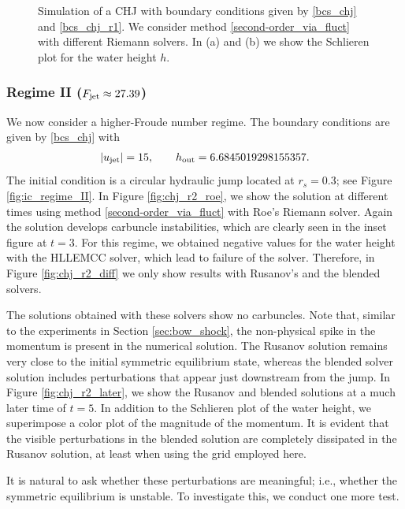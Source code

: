 \documentclass[preprint, 11pt]{article}
\newcommand{\out}{\textup{out}}
\newcommand{\jet}{{\textup{jet}}}
\newcommand{\bfu}{{u}}
\begin{document}
\begin{figure}[!h]
{\begin{tabular}{c}
    \end{tabular}
  }
    \caption{Simulation of a CHJ with boundary conditions given by \eqref{bcs_chj} and \eqref{bcs_chj_r1}.    
      We consider method \eqref{second-order_via_fluct} with different Riemann solvers.
      In (a) and (b) we show the Schlieren plot for the water height $h$.
    \label{fig:chj_r1}}
\end{figure}

\subsubsection{Regime II ($F_\jet\approx27.39$)}\label{sec:regime_ii}
We now consider a higher-Froude number regime. The boundary conditions are
given by \eqref{bcs_chj} with 
\begin{align}\label{bcs_chj_r2}
  |\bfu_\jet|=15, \qquad h_\out=6.6845019298155357.
\end{align}
The initial condition is a circular hydraulic jump located at $r_s=0.3$; see Figure \ref{fig:ic_regime_II}.
In Figure \ref{fig:chj_r2_roe}, we show the solution at different times using method
\eqref{second-order_via_fluct} with Roe's Riemann solver. Again the solution develops
carbuncle instabilities, which are clearly seen in the inset figure at $t=3$.
For this regime, we obtained negative values for the water height with
the HLLEMCC solver, which lead to failure of the solver. Therefore, in Figure
\ref{fig:chj_r2_diff} we only show results with Rusanov's and the blended
solvers.  

The solutions obtained with these solvers show no carbuncles.
{\color{OliveGreen} Note that, similar to the experiments in Section \ref{sec:bow_shock},
  the non-physical spike in the momentum is present in the numerical solution.}
The Rusanov solution remains very close to the initial symmetric equilibrium state,
whereas the blended solver solution includes perturbations that appear
just downstream from the jump.
In Figure \ref{fig:chj_r2_later}, we show the Rusanov and blended solutions at
a much later time of $t=5$.  In addition to the Schlieren plot of the water
height, we superimpose a color plot of the magnitude of the momentum. 
It is evident that the visible perturbations in the blended solution are
completely dissipated in the Rusanov solution, at least when using the grid employed here.

It is natural to ask whether these perturbations are meaningful; i.e., whether
the symmetric equilibrium is unstable.  To investigate this, we conduct one
more test.
\end{document}
